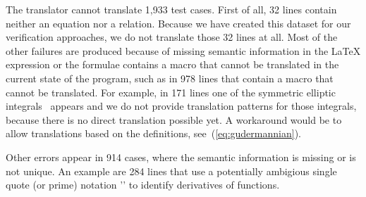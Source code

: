 The translator cannot translate 1,933 test cases. First of all, 32 lines contain neither an equation nor a relation. Because we have created this dataset for our verification approaches, we do not translate those 32 lines at all. Most of the other failures are produced because of missing semantic information in the \LaTeX{} expression or the formulae contains a macro that cannot be translated in the current state of the program, such as in 978 lines that contain a macro that cannot be translated. For example, in 171 lines one of the symmetric elliptic integrals~\cite[(19.16.1-6)]{NIST:DLMF} appears and we do not provide translation patterns for those integrals, because there is no direct translation possible yet. A workaround would be to allow translations based on the definitions, see~(\ref{eq:gudermannian}).

Other errors appear in 914 cases, where the semantic information is missing or is not unique. An example are 284 lines that use a potentially ambigious single quote (or prime) notation '\aSingleQuote' to identify derivatives of functions. 

\cleardoublepage